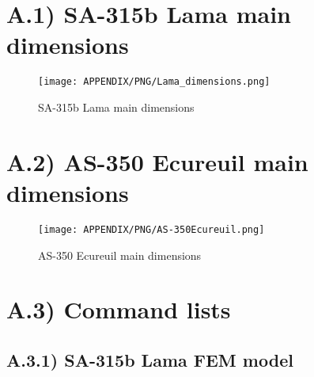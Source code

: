 

\appendix
\appendixpage
\addappheadtotoc

\section*{A.1) SA-315b Lama main dimensions}

\bigskip
\begin{figure}[h]
	\begin{center}
		\centering  		 		
		\texttt{[image: APPENDIX/PNG/Lama\_dimensions.png]}
	\end{center}
	\caption {SA-315b Lama main dimensions}
\end{figure}


\clearpage
\section*{A.2) AS-350 Ecureuil main dimensions}

\bigskip
\begin{figure}[h]
	\begin{center}
		\centering  		 		
		\texttt{[image: APPENDIX/PNG/AS-350Ecureuil.png]}
	\end{center}
	\caption {AS-350 Ecureuil main dimensions}
\end{figure}

\clearpage
\section*{A.3) Command lists}
\bigskip
\subsection*{A.3.1) SA-315b Lama FEM model}
\bigskip

\clearpage


%
\clearpage

